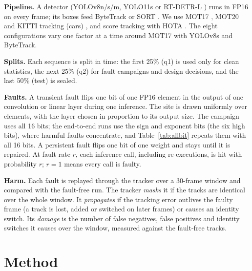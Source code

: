 \documentclass[11pt]{article}
\begin{document}
\textbf{Pipeline.} A detector (YOLOv8n/s/m, YOLO11s \citep{ultralytics} or RT-DETR-L \citep{zhao2024rtdetr}) runs in FP16 on every frame; its boxes feed ByteTrack \citep{zhang2022bytetrack} or SORT \citep{bewley2016sort}. We use MOT17 \citep{milan2016mot16}, MOT20 \citep{dendorfer2020mot20} and KITTI tracking (cars) \citep{geiger2012kitti}, and score tracking with HOTA \citep{luiten2021hota}. The eight configurations vary one factor at a time around MOT17 with YOLOv8s and ByteTrack.

\textbf{Splits.} Each sequence is split in time: the first 25\% (q1) is used only for clean statistics, the next 25\% (q2) for fault campaigns and design decisions, and the last 50\% (test) is sealed.

\textbf{Faults.} A transient fault flips one bit of one FP16 element in the output of one convolution or linear layer during one inference. The site is drawn uniformly over elements, with the layer chosen in proportion to its output size. The campaign uses all 16 bits; the end-to-end runs use the sign and exponent bits (the six high bits), where harmful faults concentrate, and Table~\ref{tab:allbit} repeats them with all 16 bits. A persistent fault flips one bit of one weight and stays until it is repaired. At fault rate $r$, each inference call, including re-executions, is hit with probability $r$; $r=1$ means every call is faulty.

\textbf{Harm.} Each fault is replayed through the tracker over a 30-frame window and compared with the fault-free run. The tracker \emph{masks} it if the tracks are identical over the whole window. It \emph{propagates} if the tracking error outlives the faulty frame (a track is lost, added or switched on later frames) or causes an identity switch. Its \emph{damage} is the number of false negatives, false positives and identity switches it causes over the window, measured against the fault-free tracks.

\section{Method}
\end{document}
